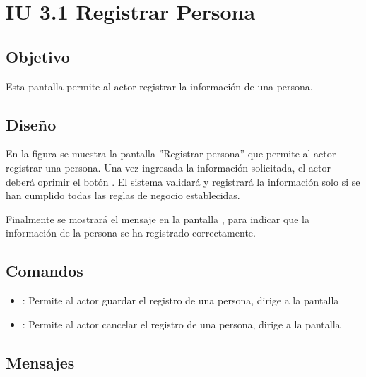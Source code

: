 \section{IU 3.1 Registrar Persona}

\subsection{Objetivo}
	Esta pantalla permite al actor registrar la información de una persona.
\subsection{Diseño}
	En la figura  se muestra la pantalla ''Registrar persona'' que permite al actor registrar una persona.
	Una vez ingresada la información solicitada, el actor deberá oprimir el botón  . El sistema validará y registrará la información solo si se han cumplido todas las reglas de negocio establecidas.
	
	Finalmente se mostrará el mensaje  en la pantalla , para indicar que la información de la persona se ha registrado correctamente.

\subsection{Comandos}
\begin{itemize}
	\item {}: Permite al actor guardar el registro de una persona, dirige a la pantalla 
	\item {}: Permite al actor cancelar el registro de una persona, dirige a la pantalla 
\end{itemize}

\subsection{Mensajes}

